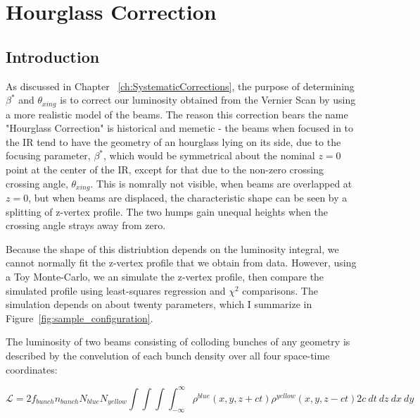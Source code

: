 

\chapter{Hourglass Correction}
\label{ch:HourglassCorrection}

\section{Introduction}
As discussed in Chapter ~\ref{ch:SystematicCorrections}, the purpose of
determining $\beta^{*}$ and $\theta_{xing}$ is to correct our luminosity
obtained from the Vernier Scan by using a more realistic model of the beams.
The reason this correction bears the name "Hourglass Correction" is historical
and memetic - the beams when focused in to the IR tend to have the geometry of
an hourglass lying on its side, due to the focusing parameter, $\beta^{*}$,
which would be symmetrical about the nominal $z = 0$ point at the center of the
IR, except for that due to the non-zero crossing crossing angle,
$\theta_{xing}$. This is nomrally not visible, when beams are overlapped at $z =
0$, but when beams are displaced, the characteristic shape can be seen by a
splitting of z-vertex profile. The two humps gain unequal heights when the
crossing angle strays away from zero.

Because the shape of this distriubtion depends on the luminosity integral, we
cannot normally fit the z-vertex profile that we obtain from data. However,
using a Toy Monte-Carlo, we an simulate the z-vertex profile, then compare the
simulated profile using least-squares regression and $\chi^{2}$ comparisons. The
simulation depends on about twenty parameters, which I summarize in
Figure~\ref{fig:sample_configuration}. 

The luminosity of two beams consisting of colloding bunches of any geometry is
described by the convelution of each bunch density over all four space-time
coordinates:

\begin{equation}
\label{eq:generalluminosity}
\mathcal{L} = {2 f_{bunch} n_{bunch} N_{blue} N_{yellow} \int \int \int
	\int_{-\infty}^{\infty }\rho^{blue}(x,y,z+ct)\rho^{yellow}(x,y,z-ct)2c\
	dt\ dz\ dx\ dy } 
\end{equation}


